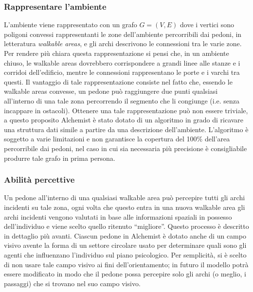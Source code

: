 \documentclass[12pt,a4paper,openright,oneside]{book}
\begin{document}
\subsubsection{Rappresentare l'ambiente} 
L’ambiente viene rappresentato con un grafo \(G = (V, E)\) dove i vertici sono poligoni convessi rappresentanti le zone dell’ambiente percorribili dai pedoni, in letteratura \emph{walkable areas}, e gli archi descrivono le connessioni tra le varie zone. Per rendere più chiara questa rappresentazione si pensi che, in un ambiente chiuso, le walkable areas dovrebbero corrispondere a grandi linee alle stanze e i corridoi dell’edificio, mentre le connessioni rappresentano le porte e i varchi tra questi. Il vantaggio di tale rappresentazione consiste nel fatto che, essendo le walkable areas convesse, un pedone può  raggiungere due punti qualsiasi all’interno di una tale zona percorrendo il segmento che li congiunge (i.e. senza incappare in ostacoli). Ottenere una tale rappresentazione può non essere triviale, a questo proposito Alchemist è stato dotato di un algoritmo \cite{HaleDeaccon} in grado di ricavare una struttura dati simile a partire da una descrizione dell’ambiente. L’algoritmo è soggetto a varie limitazioni e non garantisce la copertura del 100\% dell’area percorribile dai pedoni, nel caso in cui sia necessaria più precisione è consigliabile produrre tale grafo in prima persona.

\subsubsection{Abilità percettive}
Un pedone all’interno di una qualsiasi walkable area può percepire tutti gli archi incidenti su tale zona, ogni volta che questo entra in una nuova walkable area gli archi incidenti vengono valutati in base alle informazioni spaziali in possesso dell’individuo e viene scelto quello ritenuto “migliore”. Questo processo è descritto in dettaglio più avanti.
Ciascun pedone in Alchemist è dotato anche di un campo visivo avente la forma di un settore circolare usato per determinare quali sono gli agenti che influenzano l’individuo sul piano psicologico. Per semplicità, si è scelto di non usare tale campo visivo ai fini dell’orientamento; in futuro il modello potrà essere modificato in modo che il pedone possa percepire solo gli archi (o meglio, i passaggi) che si trovano nel suo campo visivo.
\end{document}
